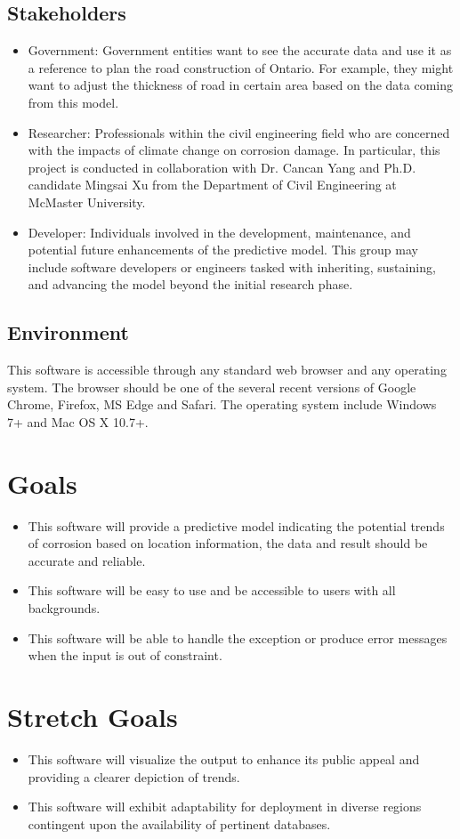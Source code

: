 \documentclass{article}
\begin{document}
\subsection{Stakeholders}
\begin{itemize}
\item Government: Government entities want to see the accurate data and use it as a reference to plan the road construction of Ontario. For example, they might want to adjust the thickness of road in certain area based on the data coming from this model.
\item Researcher: Professionals within the civil engineering field who are concerned with the impacts of climate change on corrosion damage. In particular, this project is conducted in collaboration with Dr. Cancan Yang and Ph.D. candidate Mingsai Xu from the Department of Civil Engineering at McMaster University.
\item Developer: Individuals involved in the development, maintenance, and potential future enhancements of the predictive model. This group may include software developers or engineers tasked with inheriting, sustaining, and advancing the model beyond the initial research phase.
\end{itemize}


\subsection{Environment}
This software is accessible through any standard web browser and any operating system. The browser should be one of the several recent versions of Google Chrome, Firefox, MS Edge and Safari. The operating system include Windows 7+ and Mac OS X 10.7+.

\section{Goals}
\begin{itemize}
\item This software will provide a predictive model indicating the potential trends of corrosion based on location information, the data and result should be accurate and reliable.
\item This software will be easy to use and be accessible to users with all backgrounds. 
\item This software will be able to handle the exception or produce error messages when the input is out of constraint.
\end{itemize}

\section{Stretch Goals}
\begin{itemize}
\item This software will visualize the output to enhance its public appeal and providing a clearer depiction of trends.
\item This software will exhibit adaptability for deployment in diverse regions contingent upon the availability of pertinent databases.
\end{itemize}
\end{document}
